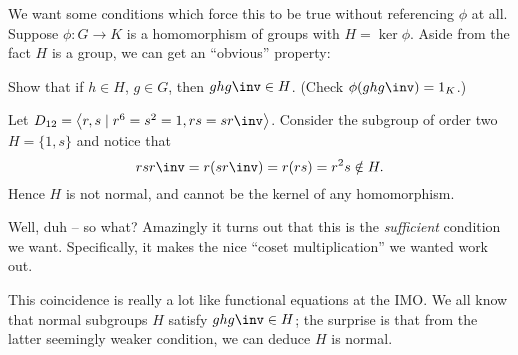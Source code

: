 We want some conditions which force this to be true without referencing $\phi$ at all.
Suppose $\phi \colon G \to K$ is a homomorphism of groups with $H = \ker\phi$.
Aside from the fact $H$ is a group, we can get an ``obvious'' property:
\begin{ques}
	Show that if $h \in H$, $g \in G$,
	then $ghg\inv \in H$.
	(Check $\phi(ghg\inv) = 1_K$.)
\end{ques}
\begin{example}
	\label{ex:dihedral_normal_subgroup}
	Let $D_{12} = \left<r,s \mid r^6=s^2=1, rs=sr\inv\right>$.
	Consider the subgroup of order two $H = \{1,s\}$
	and notice that \[ rsr\inv = r(sr\inv)= r(rs) = r^2s \notin H. \]
	Hence $H$ is not normal, and cannot be the kernel of any homomorphism.
\end{example}
Well, duh -- so what?
Amazingly it turns out that this is the \emph{sufficient} condition we want.
Specifically, it makes the nice ``coset multiplication'' we wanted work out.
\begin{remark}
	This coincidence is really a lot like functional equations at the IMO.
	We all know that normal subgroups $H$ satisfy $ghg\inv \in H$;
	the surprise is that from the latter seemingly weaker condition,
	we can deduce $H$ is normal.
\end{remark}

